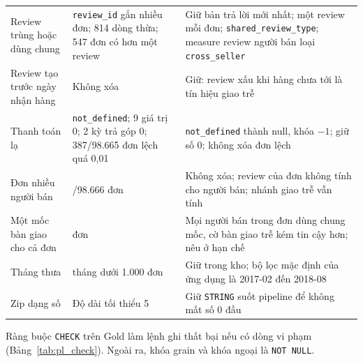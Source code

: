 \documentclass[a4paper]{article}
\begin{document}
{\begin{longtable}{@{}>{\raggedright\arraybackslash}p{3.3cm}>{\raggedright\arraybackslash}p{4.5cm}>{\raggedright\arraybackslash}p{8.2cm}@{}}
\addlinespace
Review trùng hoặc dùng chung & 789 \texttt{review\_\allowbreak{}id} gắn nhiều đơn; 814 dòng thừa; 547 đơn có hơn một review & Giữ bản trả lời mới nhất; một review mỗi đơn; \texttt{shared\_\allowbreak{}review\_\allowbreak{}type}; measure review người bán loại \texttt{cross\_\allowbreak{}seller} \\
\addlinespace
Review tạo trước ngày nhận hàng & Không xóa & Giữ: review xấu khi hàng chưa tới là tín hiệu giao trễ \\
\addlinespace
Thanh toán lạ & 3 \texttt{not\_\allowbreak{}defined}; 9 giá trị 0; 2 kỳ trả góp 0; 387/98.665 đơn lệch quá 0,01 & \texttt{not\_\allowbreak{}defined} thành null, khóa $-1$; giữ số 0; không xóa đơn lệch \\
\addlinespace
Đơn nhiều người bán & 1.278/98.666 đơn & Không xóa; review của đơn không tính cho người bán; nhánh giao trễ vẫn tính \\
\addlinespace
Một mốc bàn giao cho cả đơn & 1.278 đơn & Mọi người bán trong đơn dùng chung mốc, cờ bàn giao trễ kém tin cậy hơn; nêu ở hạn chế \\
\addlinespace
Tháng thưa & 6 tháng dưới 1.000 đơn & Giữ trong kho; bộ lọc mặc định của ứng dụng là 2017-02 đến 2018-08 \\
\addlinespace
Zip dạng số & Độ dài tối thiểu 5 & Giữ \texttt{STRING} suốt pipeline để không mất số 0 đầu \\
\end{longtable}
}

Ràng buộc \texttt{CHECK} trên Gold làm lệnh ghi thất bại nếu có dòng vi phạm (Bảng~\ref{tab:pl_check}). Ngoài ra, khóa grain và khóa ngoại là \texttt{NOT NULL}.
\end{document}
